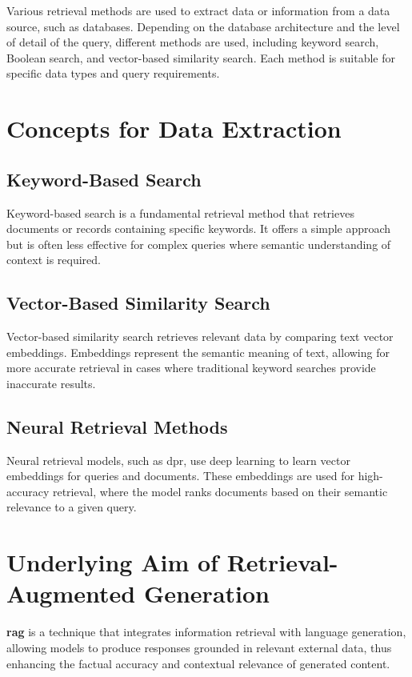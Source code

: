 Various retrieval methods are used to extract data or information from a data source, such as databases. Depending on the database architecture and the level of detail of the query, different methods are used, including keyword search, Boolean search, and vector-based similarity search. Each method is suitable for specific data types and query requirements.
\section{Concepts for Data Extraction}\label{sec:data-extraction-concepts}

\subsection{Keyword-Based Search}\label{sec:keyword-search}
Keyword-based search is a fundamental retrieval method that retrieves documents or records containing specific keywords. It offers a simple approach but is often less effective for complex queries where semantic understanding of context is required.

\subsection{Vector-Based Similarity Search}\label{sec:vector-similarity-search}
Vector-based similarity search retrieves relevant data by comparing text vector embeddings. Embeddings represent the semantic meaning of text, allowing for more accurate retrieval in cases where traditional keyword searches provide inaccurate results.

\subsection{Neural Retrieval Methods}\label{sec:neural-retrieval}
Neural retrieval models, such as \ac{dpr}, use deep learning to learn vector embeddings for queries and documents. These embeddings are used for high-accuracy retrieval, where the model ranks documents based on their semantic relevance to a given query.

\section{Underlying Aim of Retrieval-Augmented Generation}\label{sec:aim-of-rag}

\begin{definition}\label{def:rag}
    \textbf{\ac{rag}} is a technique that integrates information retrieval with language generation, allowing models to produce responses grounded in relevant external data, thus enhancing the factual accuracy and contextual relevance of generated content.
\end{definition}

